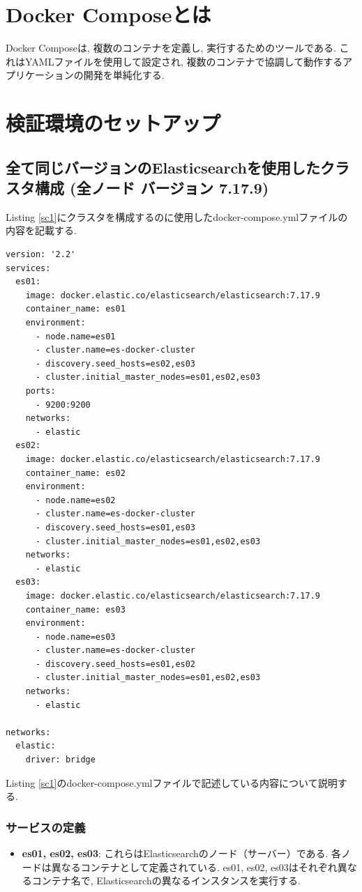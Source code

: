 \documentclass[a4j,12pt,]{jarticle}
\begin{document}
\section{Docker Composeとは}
Docker Composeは, 複数のコンテナを定義し, 実行するためのツールである. これはYAMLファイルを使用して設定され, 複数のコンテナで協調して動作するアプリケーションの開発を単純化する.

\section{検証環境のセットアップ}
\subsection{全て同じバージョンのElasticsearchを使用したクラスタ構成 (全ノード バージョン 7.17.9)}

Listing \ref{sc1}にクラスタを構成するのに使用したdocker-compose.ymlファイルの内容を記載する.

\begin{lstlisting}[caption=全て同じバージョンのElasticsearchを使用したクラスタを構成するdocker-compose.yml, label=sc1]
version: '2.2'
services:
  es01:
    image: docker.elastic.co/elasticsearch/elasticsearch:7.17.9
    container_name: es01
    environment:
      - node.name=es01
      - cluster.name=es-docker-cluster
      - discovery.seed_hosts=es02,es03
      - cluster.initial_master_nodes=es01,es02,es03
    ports:
      - 9200:9200
    networks:
      - elastic
  es02:
    image: docker.elastic.co/elasticsearch/elasticsearch:7.17.9
    container_name: es02
    environment:
      - node.name=es02
      - cluster.name=es-docker-cluster
      - discovery.seed_hosts=es01,es03
      - cluster.initial_master_nodes=es01,es02,es03
    networks:
      - elastic
  es03:
    image: docker.elastic.co/elasticsearch/elasticsearch:7.17.9
    container_name: es03
    environment:
      - node.name=es03
      - cluster.name=es-docker-cluster
      - discovery.seed_hosts=es01,es02
      - cluster.initial_master_nodes=es01,es02,es03
    networks:
      - elastic

networks:
  elastic:
    driver: bridge
\end{lstlisting}

Listing \ref{sc1}のdocker-compose.ymlファイルで記述している内容について説明する.

\subsubsection*{サービスの定義}
\begin{itemize}
  \item \textbf{es01, es02, es03}: これらはElasticsearchのノード（サーバー）である. 各ノードは異なるコンテナとして定義されている. es01, es02, es03はそれぞれ異なるコンテナ名で, Elasticsearchの異なるインスタンスを実行する.
\end{itemize}
\end{document}
